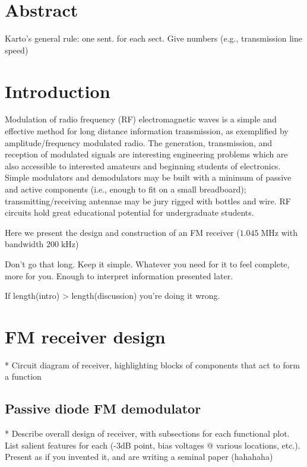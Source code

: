 \documentclass[11pt]{article}
\newcommand {\mt}{\mathrm}
\newcommand {\unit}[1]{\; \mt{#1}}
\begin{document}
\section{Abstract}

Karto's general rule: one sent. for each sect.
Give numbers (e.g., transmission line speed)

\section{Introduction}

Modulation of radio frequency (RF) electromagnetic waves is a simple and
effective method for long distance information transmission, as exemplified by
amplitude/frequency modulated radio.  The generation, transmission, and
reception of modulated signals are interesting engineering problems which are
also accessible to interested amateurs and beginning students of electronics.
Simple modulators and demodulators may be built with a minimum
of passive and active components (i.e., enough to fit on a small breadboard);
transmitting/receiving antennae may be jury rigged with bottles and wire.
RF circuits hold great educational potential for undergraduate students.

Here we present the design and construction of an FM receiver ($1.045
\unit{MHz}$ with bandwidth $200 \unit{kHz}$)

Don't go that long.  Keep it simple.  Whatever you need for it to feel
complete, more for you.  Enough to interpret information presented later.

If length(intro) > length(discussion) you're doing it wrong.

\section{FM receiver design}

* Circuit diagram of receiver, highlighting blocks of components that act to form a function

\subsection{Passive diode FM demodulator}

* Describe overall design of receiver, with subsections for each functional plot.  List salient features for each (-3dB point, bias voltages @ various locations, etc.). Present as if you invented it, and are writing a seminal paper (hahahaha)
\end{document}

